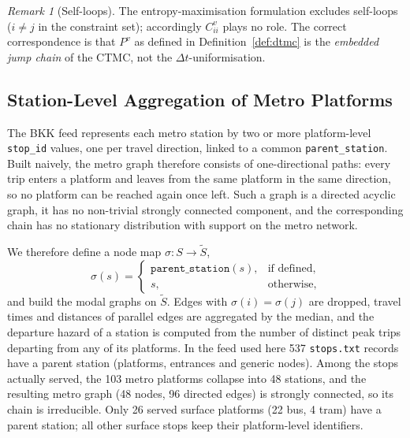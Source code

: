 \documentclass[12pt,a4paper]{article}
\theoremstyle{plain}
\theoremstyle{definition}
\theoremstyle{remark}
\newtheorem{remark}[theorem]{Remark}
\begin{document}
\begin{remark}[Self-loops]
The entropy-maximisation formulation excludes self-loops ($i\ne j$ in the
constraint set); accordingly $C^v_{ii}$ plays no role.  The correct
correspondence is that $P^v$ as defined in Definition~\ref{def:dtmc} is the
\emph{embedded jump chain} of the CTMC, not the $\Delta t$-uniformisation.
\end{remark}

\subsection{Station-Level Aggregation of Metro Platforms}
\label{sec:platforms}

The BKK feed represents each metro station by two or more platform-level
\texttt{stop\_id} values, one per travel direction, linked to a common
\texttt{parent\_station}.  Built naively, the metro graph therefore consists of
one-directional paths: every trip enters a platform and leaves from the same
platform in the same direction, so no platform can be reached again once left.
Such a graph is a directed acyclic graph, it has no non-trivial strongly
connected component, and the corresponding chain has no stationary
distribution with support on the metro network.

We therefore define a node map $\sigma:S\to\tilde S$,
\begin{equation}
  \sigma(s)=\begin{cases}
    \texttt{parent\_station}(s), & \text{if defined},\\
    s, & \text{otherwise},
  \end{cases}
\end{equation}
and build the modal graphs on $\tilde S$.  Edges with $\sigma(i)=\sigma(j)$ are
dropped, travel times and distances of parallel edges are aggregated by the
median, and the departure hazard of a station is computed from the number of
distinct peak trips departing from any of its platforms.  In the feed used here
537 \texttt{stops.txt} records have a parent station (platforms, entrances and
generic nodes).  Among the stops actually served, the 103 metro platforms
collapse into 48 stations, and the resulting metro graph (48 nodes, 96 directed
edges) is strongly connected, so its chain is irreducible.  Only 26 served
surface platforms (22 bus, 4 tram) have a parent station; all other surface
stops keep their platform-level identifiers.

\end{document}
